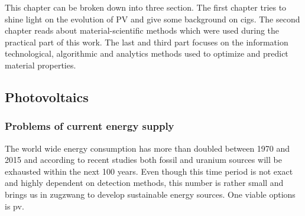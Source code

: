 This chapter can be broken down into three section. 
The first chapter tries to shine light on the evolution of PV and give some background on \gls{cigs}.
The second chapter reads about material-scientific methods which were used during the practical part of this work. 
The last and third part focuses on the information technological, algorithmic and analytics methods used to optimize and predict material properties. 
\subsection{Photovoltaics}
\subsubsection{Problems of current energy supply}
The world wide energy consumption has more than doubled between 1970 and 2015\cite{BP2017} 
and according to recent studies both fossil\cite{BGR2017} and uranium sources\cite{Uran2006} 
will be exhausted within the next 100 years. 
Even though this time period is not exact and highly dependent on detection methods, 
this number is rather small and brings us in zugzwang to develop sustainable energy sources. 
One viable options is \gls{pv}.

\iffalse
The basis for all pvs is the photovoltaik effect which was entdeckt by Albert Einstein adn for which he got the Nobel price. 
The Prinziple is easy: When the energy (E = hv) of the light is \td{large,strong,high}er 
than the binding energy of an electron the electron is ejected with the remaining energy as kinetic energy 
\begin{math}
	E_{kin}=hv - Eb
\end{math}
Different Materials have different binding energies. 
Metals do have in general lower binding energies than covalent bound material and semiconductors do have even lowers E_b. Really? 
That's Silica is in a lot of PVs. 
The next generation of PVs. 
CIGS has in contrast to silicon based PV a direct band gap\td{source and what does that mean?}
duennschicht pv, haben eine effeftivitaet von 7-16\% vs 15-22\% \cite{Mertens2018}
\fi
